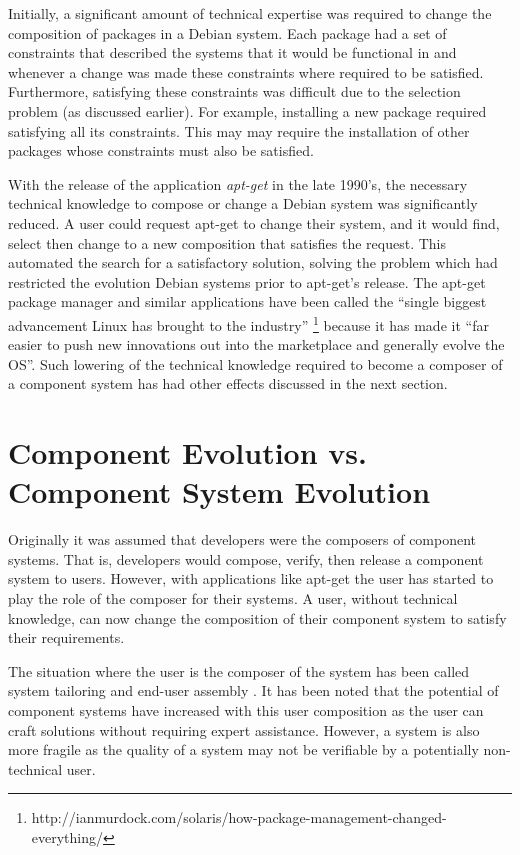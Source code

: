 Initially, a significant amount of technical expertise was required to change the composition of packages in a Debian system.
Each package had a set of constraints that described the systems that it would be functional in
and whenever a change was made these constraints where required to be satisfied.  
Furthermore, satisfying these constraints was difficult due to the selection problem (as discussed earlier).
For example, installing a new package required satisfying all its constraints.
This may may require the installation of other packages whose constraints must also be satisfied. 

With the release of the application \textit{apt-get} in the late 1990's, the necessary technical knowledge to compose or change a Debian system was significantly reduced.
A user could request apt-get to change their system, and it would find, select then change to a new composition that satisfies the request.
This automated the search for a satisfactory solution, solving the problem which had restricted the evolution Debian systems prior to apt-get's release.
The apt-get package manager and similar applications have been called the ``single biggest advancement Linux has brought to the industry'' 
\footnote{http://ianmurdock.com/solaris/how-package-management-changed-everything/} 
because it has made it ``far easier to push new innovations out into the marketplace and generally evolve the OS''.
Such lowering of the technical knowledge required to become a composer of a component system has had other effects discussed in the next section.

\section{Component Evolution vs. Component System Evolution}
\label{background.componentsystemevolution}
Originally it was assumed that developers were the composers \citep{Parnas1972,PrietoDiaz1987} of component systems.
That is, developers would compose, verify, then release a component system to users.
However, with applications like apt-get the user has started to play the role of the composer for their systems.
A user, without technical knowledge, can now change the composition of their component system to satisfy their requirements.

The situation where the user is the composer of the system has been called system tailoring \citep{Morch1997} and end-user assembly \citep{Szyperski2002}. 
It has been noted that the potential of component systems have increased with this user composition \citep{Szyperski2002} as the user can craft solutions without requiring expert assistance.
However, a system is also more fragile as the quality of a system may not be verifiable by a potentially non-technical user.

